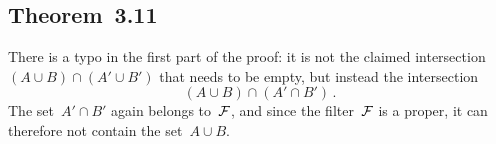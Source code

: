 \subsection{Theorem~3.11}

There is a typo in the first part of the proof:
it is not the claimed intersection~$(A ∪ B) ∩ (A' ∪ B')$ that needs to be empty, but instead the intersection
\[
	(A ∪ B) ∩ (A' ∩ B') \,.
\]
The set~$A' ∩ B'$ again belongs to~$\mathcal{F}$, and since the filter~$\mathcal{F}$ is a proper, it can therefore not contain the set~$A ∪ B$.
